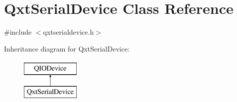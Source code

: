 \hypertarget{class_qxt_serial_device}{\section{Qxt\-Serial\-Device Class Reference}
\label{class_qxt_serial_device}
}


{\ttfamily \#include $<$qxtserialdevice.\-h$>$}

Inheritance diagram for Qxt\-Serial\-Device\-:\begin{figure}[H]
\begin{center}
\leavevmode
\includegraphics[height=2.000000cm]{class_qxt_serial_device}
\end{center}
\end{figure}
